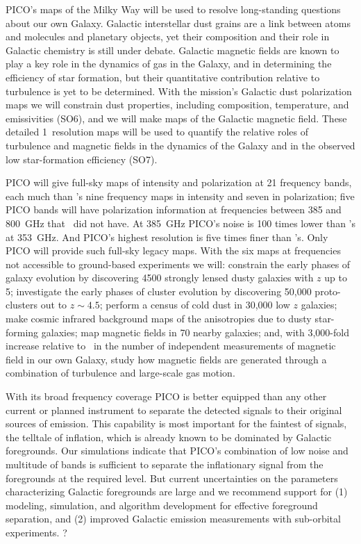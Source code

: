 \documentclass[PICOReport.tex]{subfiles}
\begin{document}

PICO's maps of the Milky Way will be used to resolve long-standing questions about our own Galaxy. Galactic interstellar dust grains are a link between atoms and molecules and planetary objects, yet their composition and their role in Galactic chemistry is still under debate. Galactic magnetic fields are known to play a key role in the dynamics of gas in the Galaxy, and in determining the efficiency of star formation, but their quantitative contribution relative to turbulence is yet to be determined. With the mission's Galactic dust polarization maps we will constrain dust properties, including composition, temperature, and emissivities (SO6), and we will make maps of the Galactic magnetic field. These detailed 1\arcmin\ resolution maps will be used to quantify the relative roles of turbulence and magnetic fields in the dynamics of the Galaxy and in the observed low star-formation efficiency (SO7). 

PICO will give full-sky maps of intensity and polarization at 21 frequency bands, each much than \planck 's nine frequency maps in intensity and seven in polarization; five PICO bands will have polarization information at frequencies between 385 and 800~GHz that \planck\ did not have. At 385~GHz PICO's noise is 100 times lower than \planck 's at 353~GHz. And PICO's highest resolution is five times finer than \planck 's. Only PICO will provide such full-sky legacy maps. With the six maps at frequencies not accessible to ground-based experiments we will: constrain the early phases of galaxy evolution by discovering 4500 strongly lensed dusty galaxies with $z$ up to 5; investigate the early phases of cluster evolution by discovering 50,000 proto-clusters out to $z\sim4.5$; perform a census of cold dust in 30,000 low $z$ galaxies; make cosmic infrared background maps of the anisotropies due to dusty star-forming galaxies; map magnetic fields in 70 nearby galaxies; and, with 3,000-fold increase relative to \planck\ in the number of independent measurements of magnetic field in our own Galaxy, study how magnetic fields are generated through a combination of turbulence and large-scale gas motion. 

With its broad frequency coverage PICO is better equipped than any other current or planned instrument to separate the detected signals to their original sources of emission.  This capability is most important for the faintest of signals, the telltale of inflation, which is already known to be dominated by Galactic foregrounds. Our simulations indicate that PICO's combination of low noise and multitude of bands is sufficient to separate the inflationary signal from the foregrounds at the required level. But current uncertainties on the parameters characterizing Galactic foregrounds are large and we recommend support for (1) modeling, simulation, and algorithm development for effective foreground separation, and (2) improved Galactic emission measurements with sub-orbital experiments. 
?
\end{document}
